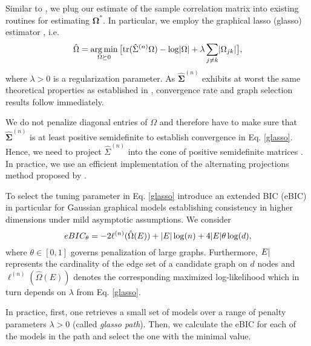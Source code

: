 Similar to \citet{Fan17}, we plug our estimate of the sample correlation matrix into existing routines for estimating $\mathbf{\Omega}^*$. In particular, we employ the graphical lasso (glasso) estimator \citep{Friedman08}, i.e.
\begin{equation}\label{glasso}
    \hat{\Omega} = \argmin_{\Omega \succeq 0} \big[\text{tr}(\hat{\Sigma}^{(n)}\Omega) - \log\Abs{\Omega} + \lambda \sum_{j\neq k}\Abs{\Omega_{jk}}\big],
\end{equation}
where $\lambda > 0$ is a regularization parameter. As $\hat{\mathbf\Sigma}^{(n)}$ exhibits at worst the same theoretical properties as established in %
\citet{Liu09}, convergence rate and graph selection results follow immediately.

We do not penalize diagonal entries of $\Omega$ and therefore have to make sure that $\hat{\mathbf\Sigma}^{(n)}$ is at least positive semidefinite to establish convergence in Eq. \eqref{glasso}. Hence, we need to project $\hat{\Sigma}^{(n)}$ into the cone of positive semidefinite matrices \citep[compare also][]{Liu12, Fan17}. In practice, we use an efficient implementation of the alternating projections method proposed by \citet{Higham88}.

To select the tuning parameter in Eq. \eqref{glasso}
\citet{Foygel10} introduce an extended BIC (eBIC) in particular for Gaussian graphical models establishing consistency in higher dimensions under mild asymptotic assumptions. We consider
\begin{equation}\label{EBIC}
    eBIC_\theta = -2 \ell^{(n)}(\hat{\Omega}(E)) + \Abs{E} \log(n) + 4 \Abs{E}\theta \log(d),
\end{equation}
where $\theta \in [0,1]$ governs penalization of large graphs. Furthermore, $\abs{E}$ represents the cardinality of the edge set of a candidate graph on $d$ nodes and $\ell^{(n)}(\hat{\Omega}(E))$ denotes the corresponding maximized log-likelihood \citep[see][for more details]{Foygel10} which in turn depends on $\lambda$ from Eq. \eqref{glasso}.

In practice, first, one retrieves a small set of models over a range of penalty parameters $\lambda > 0$ (called \textit{glasso path}). Then, we calculate the eBIC for each of the models in the path and select the one with the minimal value.

